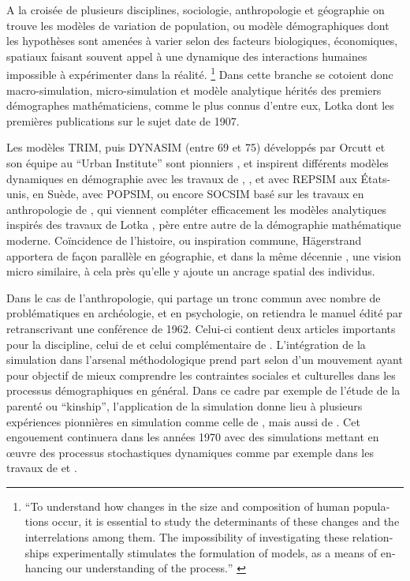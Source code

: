 A la croisée de plusieurs disciplines, sociologie, anthropologie et géographie on trouve les modèles de variation de population, ou modèle démographiques dont les hypothèses sont amenées à varier selon des facteurs biologiques, économiques, spatiaux faisant souvent appel à une dynamique des interactions humaines impossible à expérimenter dans la réalité. \footnote {\foreignquote{english}{To understand how changes in the size and composition of human populations occur, it is essential to study the determinants of these changes and the interrelations among them. The impossibility of investigating these relationships experimentally stimulates the formulation of models, as a means of enhancing our understanding of the process.} \autocite{Sheps1971}} Dans cette branche se cotoient donc macro-simulation, micro-simulation et modèle analytique hérités des premiers démographes mathématiciens, comme le plus connus d'entre eux, Lotka dont les premières publications sur le sujet date de 1907. \autocite[355]{Veron2009}

Les modèles TRIM, puis DYNASIM (entre 69 et 75) développés par Orcutt et son équipe au \foreignquote{english}{Urban Institute} sont pionniers \autocite{Orcutt1957, Orcutt1960, Orcutt1976}, et inspirent différents modèles dynamiques en démographie avec les travaux de \autocite{Perrin1964}, \textcite{Sheps1971}, et \textcite{Ridley1966} avec REPSIM aux États-unis,  \textcite{Hyrenius1964} en Suède, \textcite{Horvitz1971} avec POPSIM, ou encore SOCSIM basé sur les travaux en anthropologie de \textcite{Gilbert1966}, qui viennent compléter efficacement les modèles analytiques inspirés des travaux de Lotka \autocite{Sheps1971}, père entre autre de la démographie mathématique moderne. Coïncidence de l'histoire, ou inspiration commune, Hägerstrand apportera de façon parallèle en géographie, et dans la même décennie \autocite{Hagerstrand1952, Hagerstrand1967}, une vision micro similaire, à cela près qu'elle y ajoute un ancrage spatial des individus.

Dans le cas de l'anthropologie, qui partage un tronc commun avec nombre de problématiques en archéologie, et en psychologie, on retiendra le manuel édité par \textcite{Hymes1965} retranscrivant une conférence de 1962. Celui-ci contient deux articles importants pour la discipline, celui de \textcite{Gullahorn1965} et celui complémentaire de \textcite{Hays1965}. L'intégration de la simulation dans l'arsenal méthodologique prend part selon \textcite[274]{Bentley2009} d'un mouvement ayant pour objectif de mieux comprendre les contraintes sociales et culturelles dans les processus démographiques en général. Dans ce cadre par exemple de l'étude de la parenté ou \foreignquote{english}{kinship}, l'application de la simulation donne lieu à plusieurs expériences pionnières \autocite{Dyke1981} en simulation comme celle de \textcite{Kunstadter1963}, mais aussi de \textcite{Gilbert1966}. Cet engouement continuera dans les années 1970 \autocite{Read1999} avec des simulations mettant en œuvre des processus stochastiques dynamiques comme par exemple dans les travaux de \textcite{Howell1978} et \textcite{Thomas1973}.

